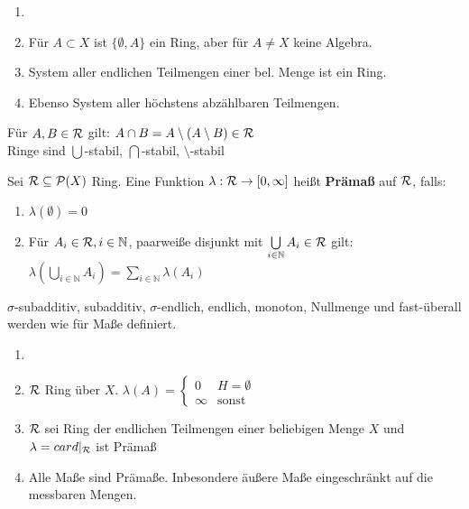 \documentclass[11pt,a4paper,fleqn,openany]{report}
\begin{document}
    \begin{example}
      \begin{enumerate}[label=\roman*)]
        \item[]
        \item Für $A \subset X$ ist $\{\emptyset, A\}$ ein Ring, aber für $A \neq X$ keine Algebra.
        \item System aller endlichen Teilmengen einer bel. Menge ist ein Ring.
        \item Ebenso System aller höchstens abzählbaren Teilmengen. 
      \end{enumerate}
    \end{example}

    \begin{remark}
      Für $A,B \in \mathcal{R}$ gilt: $A \cap B = A \setminus (A \setminus B) \in \mathcal{R}$\\
      Ringe sind $\bigcup$-stabil, $\bigcap$-stabil, $\setminus$-stabil
    \end{remark}

    \begin{definition}
      Sei $\mathcal{R} \subseteq \mathcal{P}(X)$ Ring. Eine Funktion $\lambda: \mathcal{R} \to [0, \infty]$ heißt \textbf{Prämaß} auf $\mathcal{R}$, falls:
      \begin{enumerate}[label=\roman*)]
        \item $\lambda(\emptyset) = 0$
        \item Für $A_i \in \mathcal{R}, i \in \mathbb{N}$, paarweiße disjunkt mit $\bigcup\limits_{i \in \mathbb{N}} A_i \in \mathcal{R}$ gilt:\\
        $\lambda(\bigcup\limits_{i \in \mathbb{N}} A_i) = \sum\limits_{i \in \mathbb{N}} \lambda(A_i) $
      \end{enumerate}
    \end{definition}

    \begin{remark}
      $\sigma$-subadditiv, subadditiv, $\sigma$-endlich, endlich, monoton, Nullmenge und fast-überall werden wie für Maße definiert. 
    \end{remark}

    \begin{example}
      \begin{enumerate}[label=\roman*)]
        \item[]
        \item $\mathcal{R}$ Ring über $X$. $\lambda(A) = \begin{cases}
                0 & H = \emptyset\\
                \infty & \text{sonst}
              \end{cases}$
        \item $\mathcal{R}$ sei Ring der endlichen Teilmengen einer beliebigen Menge $X$ und $\lambda = card|_{\mathcal{R}}$ ist Prämaß
        \item Alle Maße sind Prämaße. Inbesondere äußere Maße eingeschränkt auf die messbaren Mengen.
      \end{enumerate}
    \end{example}
\end{document}
